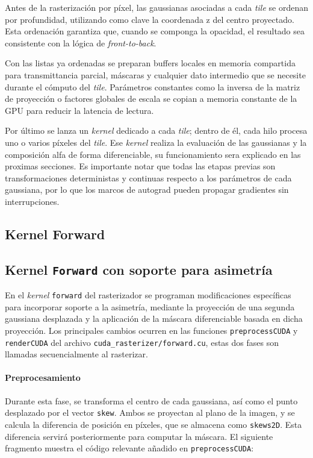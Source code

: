 Antes de la rasterización por píxel, las gaussianas asociadas a cada \textit{tile} se ordenan por profundidad, utilizando como clave la coordenada z del centro proyectado. Esta ordenación garantiza que, cuando se componga la opacidad, el resultado sea consistente con la lógica de \textit{front-to-back}.

Con las listas ya ordenadas se preparan buffers locales en memoria compartida para transmittancia parcial, máscaras y cualquier dato intermedio que se necesite durante el cómputo del \textit{tile}. Parámetros constantes como la inversa de la matriz de proyección o factores globales de escala se copian a memoria constante de la GPU para reducir la latencia de lectura.

Por último se lanza un \textit{kernel} dedicado a cada \textit{tile}; dentro de él, cada hilo procesa uno o varios píxeles del \textit{tile}. Ese \textit{kernel} realiza la evaluación de las gaussianas y la composición alfa de forma diferenciable, su funcionamiento sera explicado en las proximas secciones. Es importante notar que todas las etapas previas son transformaciones deterministas y continuas respecto a los parámetros de cada gaussiana, por lo que los marcos de autograd pueden propagar gradientes sin interrupciones.


\subsection{Kernel Forward}
\subsection{Kernel \texttt{Forward} con soporte para asimetría}

En el \textit{kernel} \texttt{forward} del rasterizador se programan modificaciones específicas para incorporar soporte a la asimetría, mediante la proyección de una segunda gaussiana desplazada y la aplicación de la máscara diferenciable basada en dicha proyección. Los principales cambios ocurren en las funciones  \texttt{preprocessCUDA} y \texttt{renderCUDA} del archivo \texttt{cuda\_rasterizer/forward.cu}, estas dos fases son llamadas secuencialmente al rasterizar. 

\paragraph{Preprocesamiento}
Durante esta fase, se transforma el centro de cada gaussiana, así como el punto desplazado por el vector \texttt{skew}. Ambos se proyectan al plano de la imagen, y se calcula la diferencia de posición en píxeles, que se almacena como \texttt{skews2D}. Esta diferencia servirá posteriormente para computar la máscara. El siguiente fragmento muestra el código relevante añadido en \texttt{preprocessCUDA}:


